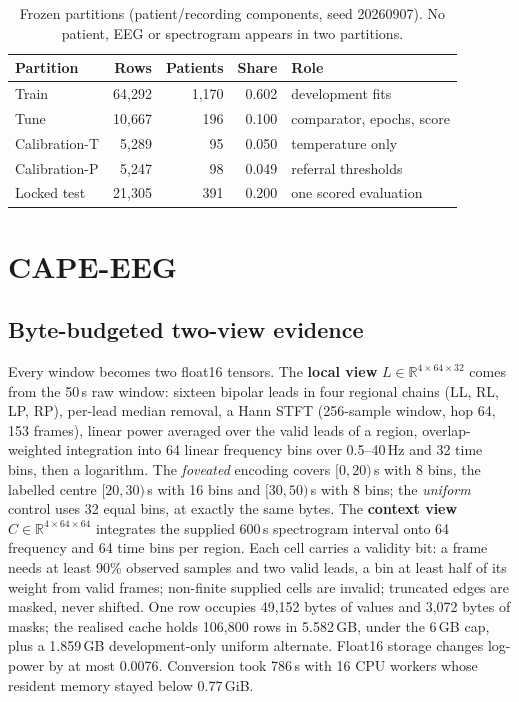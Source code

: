 \documentclass[sigconf,anonymous]{acmart}
\begin{document}
\begin{table}[t]
\caption{Frozen partitions (patient/recording components, seed 20260907). No patient, EEG or spectrogram appears in two partitions.}
\label{tab:partitions}
\small
\setlength{\tabcolsep}{4pt}
\begin{tabular}{lrrrl}
\toprule
Partition & Rows & Patients & Share & Role \\
\midrule
Train & 64,292 & 1,170 & 0.602 & development fits \\
Tune & 10,667 & 196 & 0.100 & comparator, epochs, score \\
Calibration-T & 5,289 & 95 & 0.050 & temperature only \\
Calibration-P & 5,247 & 98 & 0.049 & referral thresholds \\
Locked test & 21,305 & 391 & 0.200 & one scored evaluation \\
\bottomrule
\end{tabular}
\end{table}

\section{CAPE-EEG}
\subsection{Byte-budgeted two-view evidence}
\label{sec:cache}
Every window becomes two float16 tensors. The \textbf{local view} $L\in\mathbb{R}^{4\times 64\times 32}$ comes from the 50\,s raw window: sixteen bipolar leads in four regional chains (LL, RL, LP, RP), per-lead median removal, a Hann STFT (256-sample window, hop 64, 153 frames), linear power averaged over the valid leads of a region, overlap-weighted integration into 64 linear frequency bins over 0.5--40\,Hz and 32 time bins, then a logarithm. The \emph{foveated} encoding covers $[0,20)$\,s with 8 bins, the labelled centre $[20,30)$\,s with 16 bins and $[30,50)$\,s with 8 bins; the \emph{uniform} control uses 32 equal bins, at exactly the same bytes\alignref. The \textbf{context view} $C\in\mathbb{R}^{4\times 64\times 64}$ integrates the supplied 600\,s spectrogram interval onto 64 frequency and 64 time bins per region. Each cell carries a validity bit: a frame needs at least 90\% observed samples and two valid leads, a bin at least half of its weight from valid frames; non-finite supplied cells are invalid; truncated edges are masked, never shifted. One row occupies 49,152 bytes of values and 3,072 bytes of masks; the realised cache holds 106,800 rows in 5.582\,GB, under the 6\,GB cap, plus a 1.859\,GB development-only uniform alternate. Float16 storage changes log-power by at most 0.0076. Conversion took 786\,s with 16 CPU workers whose resident memory stayed below 0.77\,GiB.
\end{document}
